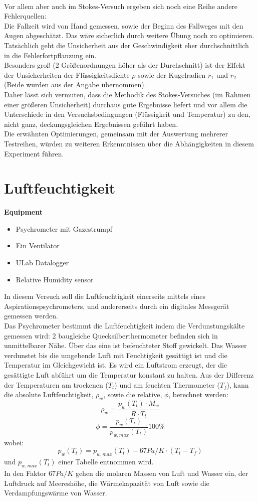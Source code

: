 \documentclass[12pt,a4paper]{article}
\begin{document}
\begin{multicols}{2}
\\
Vor allem aber auch im Stokes-Versuch ergeben sich noch eine Reihe andere Fehlerquellen:\\
Die Fallzeit wird von Hand gemessen, sowie der Beginn des Fallweges mit den Augen abgeschätzt. Das wäre sicherlich durch weitere Übung noch zu optimieren. Tatsächlich geht die Unsicherheit aus der Geschwindigkeit eher durchschnittlich in die Fehlerfortpflanzung ein.\\
Besonders groß (2 Größenordnungen höher als der Durchschnitt) ist der Effekt der Unsicherheiten der Flüssigkeitsdichte $\rho$ sowie der Kugelradien $r_1$ und $r_2$ (Beide wurden aus der Angabe übernommen).\\
Daher lässt sich vermuten, dass die Methodik des Stokes-Versuches (im Rahmen einer größeren Unsicherheit) durchaus gute Ergebnisse liefert und vor allem die Unterschiede in den Versuchsbedingungen (Flüssigkeit und Temperatur) zu den, nicht ganz, deckungsgleichen Ergebnissen geführt haben.\\
Die erwähnten Optimierungen, gemeinsam mit der Auswertung mehrerer Testreihen, würden zu weiteren Erkenntnissen über die Abhängigkeiten in diesem Experiment führen.





\section{Luftfeuchtigkeit}
\textbf{Equipment}
\begin{itemize}
	\item Psychrometer mit Gazestrumpf
	\item Ein Ventilator
	\item ULab Datalogger
	\item Relative Humidity sensor
\end{itemize}

\noindent In diesem Versuch soll die Luftfeuchtigkeit einerseits mittels eines Aspirationspsychrometers, und andererseits durch ein digitales Messgerät gemessen werden.\\
Das Psychrometer bestimmt die Luftfeuchtigkeit indem die Verdunstungskälte gemessen wird: 2 baugleiche Quecksilberthermometer befinden sich in unmittelbarer Nähe. Über das eine ist befeuchteter Stoff gewickelt. Das Wasser verdunstet bis die umgebende Luft mit Feuchtigkeit gesättigt ist und die Temperatur im Gleichgewicht ist. Es wird ein Luftstrom erzeugt, der die gesättigte Luft abführt um die Temperatur konstant zu halten. Aus der Differenz der Temperaturen am trockenen ($T_t$) und am feuchten Thermometer ($T_f$), kann die absolute Luftfeuchtigkeit, $\rho_w$, sowie die relative, $\phi$, berechnet werden:\\
$$\rho_w=\frac{p_w(T_t)\cdot M_w}{R \cdot T_t}$$
$$\phi= \frac{p_w(T_t)}{p_{w,max}(T_t)}100\%$$
wobei:
$$p_w(T_t)=p_{w,max}(T_t)-67 Pa/K \cdot (T_t-T_f)$$
und $p_{w,max}(T_t)$ einer Tabelle entnommen wird.\\
In den Faktor $67Pa/K$ gehen die molaren Massen von Luft und Wasser ein, der Luftdruck auf Meereshöhe, die Wärmekapazität von Luft sowie die Verdampfungswärme von Wasser.


\end{multicols}
\end{document}
